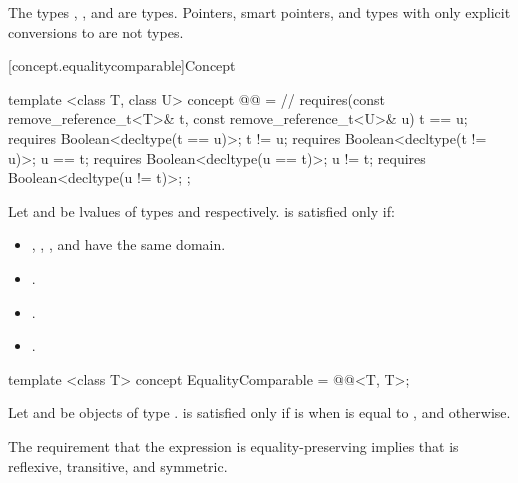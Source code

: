 \pnum
\begin{example}
The types , , and
 are 
types. Pointers, smart pointers, and types with only explicit conversions to
 are not  types.
\end{example}

[concept.equalitycomparable]{Concept }

\begin{itemdecl}
template <class T, class U>
concept @@ = // \expos
  requires(const remove_reference_t<T>& t,
           const remove_reference_t<U>& u) {
    t == u; requires Boolean<decltype(t == u)>;
    t != u; requires Boolean<decltype(t != u)>;
    u == t; requires Boolean<decltype(u == t)>;
    u != t; requires Boolean<decltype(u != t)>;
  };
\end{itemdecl}

\begin{itemdescr}
\pnum
Let  and  be lvalues of types
 and
 respectively.
is satisfied only if:
\begin{itemize}
\item {}, , , and 
      have the same domain.
\item {}.
\item {}.
\item {}.
\end{itemize}
\end{itemdescr}

%
\begin{itemdecl}
template <class T>
concept EqualityComparable = @@<T, T>;
\end{itemdecl}

\begin{itemdescr}
\pnum
Let  and  be objects of type .
 is satisfied only if
 is  when  is equal to
, and  otherwise.

\pnum
\begin{note}
The requirement that the expression  is equality-preserving
implies that \tcode{==} is reflexive, transitive, and symmetric.
\end{note}
\end{itemdescr}

